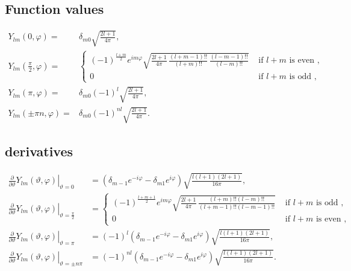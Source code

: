 \subsection{Function values}
\begin{align}
Y_{l m}(0, \varphi)=&\delta_{m 0} \sqrt{\frac{2 l+1}{4 \pi}},  \label{eq:5:14:1}\\
Y_{l m}\left(\frac{\pi}{2}, \varphi\right)=& \begin{cases}(-1)^{\frac{l+m}{2}} e^{i m \varphi} \sqrt{\frac{2 l+1}{4 \pi} \, \frac{(l+m-1)!!}{(l+m)!!} \, \frac{(l-m-1)!!}{(l-m)!!}} & \text { if } l+m \text { is even }, \\
0 & \text { if } l+m \text { is odd },\end{cases}  \label{eq:5:14:2}\\
Y_{l m}(\pi, \varphi)=&\delta_{m 0}(-1)^{l} \sqrt{\frac{2 l+1}{4 \pi}},  \label{eq:5:14:3}\\
Y_{l m}( \pm \pi n, \varphi)=&\delta_{m 0}(-1)^{n l} \sqrt{\frac{2 l+1}{4 \pi}} . \label{eq:5:14:4}
\end{align}
\subsection{derivatives}
\begin{align}
\left.\frac{\partial}{\partial \vartheta} Y_{l m}(\vartheta, \varphi)\right|_{\vartheta=0}&=\left(\delta_{m-1} e^{-i \varphi}-\delta_{m 1} e^{i \varphi}\right) \sqrt{\frac{l(l+1)(2 l+1)}{16 \pi}},  \label{eq:5:14:5}\\
\left.\frac{\partial}{\partial \vartheta} Y_{l m}(\vartheta, \varphi)\right|_{\vartheta=\frac{\pi}{2}}&= \begin{cases}(-1)^{\frac{l+m+1}{2}} e^{i m \varphi} \sqrt{\frac{2 l+1}{4 \pi} \, \frac{(l+m)!!(l-m)!!}{(l+m-1)!!(l-m-1)!!}} & \text { if } l+m \text { is odd }, \\
0 & \text { if } l+m \text { is even },\end{cases}  \label{eq:5:14:6}\\
\left.\frac{\partial}{\partial \vartheta} Y_{l m}(\vartheta, \varphi)\right|_{\vartheta=\pi}&=(-1)^{l}\left(\delta_{m-1} e^{-i \varphi}-\delta_{m 1} e^{i \varphi}\right) \sqrt{\frac{l(l+1)(2 l+1)}{16 \pi}},  \label{eq:5:14:7}\\
\left.\frac{\partial}{\partial \vartheta} Y_{l m}(\vartheta, \varphi)\right|_{\vartheta= \pm n \pi}&=(-1)^{n l}\left(\delta_{m-1} e^{-i \varphi}-\delta_{m 1} e^{i \varphi}\right) \sqrt{\frac{l(l+1)(2 l+1)}{16 \pi}}. \label{eq:5:14:8}
\end{align}

